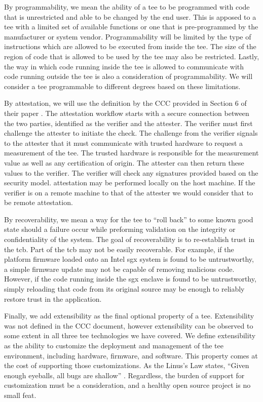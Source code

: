 By programmability, we mean the ability of a \gls{tee} to be programmed with code that is unrestricted and able to be changed by the end user. This is apposed to a \gls{tee} with a limited set of available functions or one that is pre-programmed by the manufacturer or system vendor. Programmability will be limited by the type of instructions which are allowed to be executed from inside the \gls{tee}. The size of the region of code that is allowed to be used by the \gls{tee} may also be restricted. Lastly, the way in which code running inside the \gls{tee} is allowed to communicate with code running outside the \gls{tee} is also a consideration of programmability. We will consider a \gls{tee} programmable to different degrees based on these limitations.

By \gls{attestation}, we will use the definition by the CCC provided in Section 6 of their paper \cite{cccTAC}. The attestation workflow starts with a secure connection between the two parties, identified as the verifier and the attester. The verifier must first challenge the attester to initiate the check. The challenge from the verifier signals to the attester that it must communicate with trusted hardware to request a \gls{measurement} of the \gls{tee}. The trusted hardware is responsible for the \gls{measurement} value as well as any certification of origin. The attester can then return these values to the verifier. The verifier will check any signatures provided based on the security model. \Gls{attestation} may be performed locally on the host machine. If the verifier is on a remote machine to that of the attester we would consider that to be remote \gls{attestation}.

By recoverability, we mean a way for the \gls{tee} to ``roll back'' to some known good state should a failure occur while preforming validation on the integrity or confidentiality of the system. The goal of recoverability is to re-establish trust in the \gls{tcb}. Part of the \gls{tcb} may not be easily recoverable. For example, if the platform firmware loaded onto an Intel \gls{sgx} system is found to be untrustworthy, a simple firmware update may not be capable of removing malicious code. However, if the code running inside the \gls{sgx} enclave is found to be untrustworthy, simply reloading that code from its original source may be enough to reliably restore trust in the application.

Finally, we add extensibility as the final optional property of a \gls{tee}. Extensibility was not defined in the CCC document, however extensibility can be observed to some extent in all three \gls{tee} technologies we have covered. We define extensibility as the ability to customize the deployment and management of the \gls{tee} environment, including hardware, firmware, and software. This property comes at the cost of supporting those customizations. As the Linus's Law states, ``Given enough eyeballs, all bugs are shallow'' \cite{raymond1999cathedral}. Regardless, the burden of support for customization must be a consideration, and a healthy open source project is no small feat.

